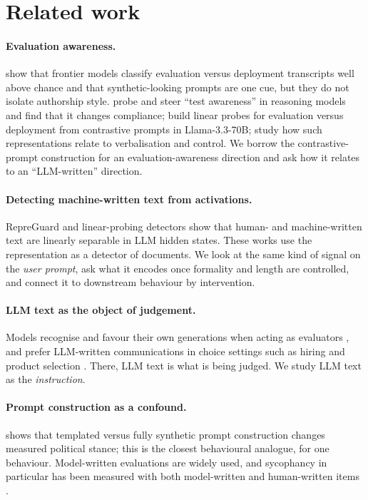 \section{Related work}

\paragraph{Evaluation awareness.} \citet{needham2025large} show that frontier models classify evaluation versus deployment transcripts well above chance and that synthetic-looking prompts are one cue, but they do not isolate authorship style. \citet{abdelnabi2025hawthorne} probe and steer ``test awareness'' in reasoning models and find that it changes compliance; \citet{nguyen2025probing} build linear probes for evaluation versus deployment from contrastive prompts in Llama-3.3-70B; \citet{heidari2026evaluation} study how such representations relate to verbalisation and control. We borrow the contrastive-prompt construction for an evaluation-awareness direction and ask how it relates to an ``LLM-written'' direction.

\paragraph{Detecting machine-written text from activations.} RepreGuard \citep{chen2025repreguard} and linear-probing detectors \citep{quaremba2026linear} show that human- and machine-written text are linearly separable in LLM hidden states. These works use the representation as a detector of documents. We look at the same kind of signal on the \emph{user prompt}, ask what it encodes once formality and length are controlled, and connect it to downstream behaviour by intervention.

\paragraph{LLM text as the object of judgement.} Models recognise and favour their own generations when acting as evaluators \citep{panickssery2024llm}, and prefer LLM-written communications in choice settings such as hiring and product selection \citep{laurito2024ai,xu2025ai}. There, LLM text is what is being judged. We study LLM text as the \emph{instruction}.

\paragraph{Prompt construction as a confound.} \citet{chalkidis2026templated} shows that templated versus fully synthetic prompt construction changes measured political stance; this is the closest behavioural analogue, for one behaviour. Model-written evaluations \citep{perez2022discovering} are widely used, and sycophancy in particular has been measured with both model-written and human-written items \citep{sharma2023towards}.

